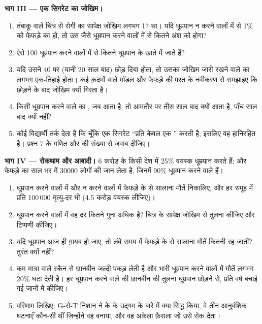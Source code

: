 \begin{problem}
\medskip
\noindent\textbf{भाग III --- एक सिगरेट का जोखिम।}
\begin{enumerate}[resume]
  \item तंबाकू वाले चित्र से रोगी का सापेक्ष जोखिम लगभग 17 था। यदि
        धूम्रपान न करने वालों में से 1\% को फेफड़े का  हो, तो उस
        जैसे धूम्रपान करने वालों में से कितने अंश को होगा?
  \item ऐसे 100 धूम्रपान करने वालों में से कितने  धूम्रपान के खाते
        में जाते हैं?
  \item यदि उसने 40 पर (यानी 20 साल बाद) छोड़ दिया होता, तो उसका जोखिम
        जारी रखने वाले का लगभग एक-तिहाई होता। कई क़दमों वाले मॉडल और
        फेफड़े की परत के नवीकरण से समझाइए कि छोड़ने के बाद जोखिम क्यों
        गिरता है।
  \item किसी धूम्रपान करने वाले का , जब आता है, तो आमतौर पर तीस साल
        बाद क्यों आता है, पाँच साल बाद क्यों नहीं?
  \item कोई विद्यार्थी तर्क देता है कि चूँकि एक सिगरेट ``प्रति 
        केवल एक '' करती है, इसलिए वह हानिरहित है। प्रश्न 7 के
        गणित और  की संख्या से जवाब दीजिए।
\end{enumerate}

\medskip
\noindent\textbf{भाग IV --- रोकथाम और आबादी।}
6 करोड़ के किसी देश में 25\% वयस्क धूम्रपान करते हैं; और फेफड़े का 
साल भर में $\num{30000}$ लोगों की जान लेता है, जिनमें 90\% धूम्रपान करने
वाले हैं।
\begin{enumerate}[resume]
  \item धूम्रपान करने वालों में और न करने वालों में फेफड़े के  से
        सालाना मौतें निकालिए, और हर समूह में प्रति 100\,000 मृत्यु-दर भी
        (4.5 करोड़ वयस्क लीजिए)।
  \item धूम्रपान करने वालों में वह दर कितने गुना अधिक है? चित्र के
        सापेक्ष जोखिम से तुलना कीजिए और टिप्पणी कीजिए।
  \item यदि धूम्रपान आज ही ग़ायब हो जाए, तो लंबे समय में फेफड़े के 
        से सालाना मौतें कितनी रह जातीं? तुरंत क्यों नहीं?
  \item कम मात्रा वाले स्कैन से छानबीन  जल्दी पकड़ लेती है और भारी
        धूम्रपान करने वालों में मौतें लगभग 20\% घटा देती है। हर धूम्रपान
        करने वाले की छानबीन की तुलना धूम्रपान छोड़ने से, प्रति वर्ष बचाई
        गई जानों में कीजिए।
  \item परिणाम लिखिए: G-से-T निशान ने  के  के उद्गम के
        बारे में क्या सिद्ध किया, वे तीन आनुवंशिक घटनाएँ कौन-सी थीं जिन्होंने
        वह  बनाया, और वह अकेला फ़ैसला जो उसे रोक देता।
\end{enumerate}
\end{problem}
